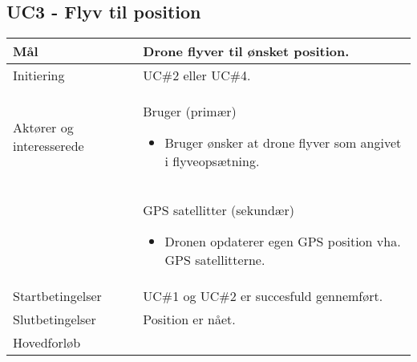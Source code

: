 \subsection*{UC3 - Flyv til position}

\begin{table}[H]
\begin{tabular}{| p{3cm}| p{11.5cm}|}
\hline


Mål	 							& Drone flyver til ønsket position. \\\hline
Initiering 							& UC\#2 eller UC\#4. \\\hline
Aktører og \newline interesserede			& Bruger (primær) 

										\begin{itemize}
											\item Bruger ønsker at drone flyver som angivet i flyveopsætning.
										\end{itemize} \\  
										
										& GPS satellitter (sekundær) 

										\begin{itemize}
											\item Dronen opdaterer egen GPS position vha. GPS satellitterne.
										\end{itemize} \\ \hline
Startbetingelser							& UC\#1 og UC\#2 er succesfuld gennemført. \\\hline
Slutbetingelser						& Position er nået. \\\hline
Hovedforløb				&
 
									\renewcommand{\labelenumi}{\arabic{enumi}.}
									\renewcommand{\labelenumii}{\Roman{enumii}:}


\end{tabular}
\end{table}
